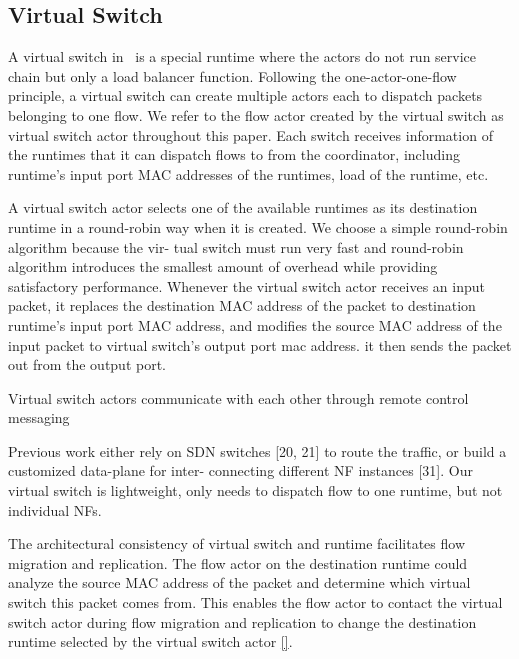 \subsection{Virtual Switch}
\label{sec:virtualswitch}

A virtual switch in \nfactor~is a special runtime where the actors do not run service chain but only a load balancer function. Following the one-actor-one-flow principle, a virtual switch can create multiple actors each to dispatch packets belonging to one flow.  We refer to the flow actor created by the virtual switch as virtual switch actor throughout this paper. Each switch receives information of the runtimes that it can dispatch flows to from the coordinator, including runtime's input port MAC addresses of the runtimes, load of the runtime, etc.


A virtual switch actor selects one of the available runtimes  as its destination runtime in a round-robin way when it is created. We choose a simple round-robin algorithm because the vir- tual switch must run very fast and round-robin algorithm introduces the smallest amount of overhead while providing satisfactory performance. Whenever the virtual switch actor receives an input packet, it replaces the destination MAC address of the packet to destination runtime's input port MAC address, and modifies the source MAC address of the input packet to virtual switch's output port mac address. it then sends the packet out from the output port.


Virtual switch actors communicate with each other through remote control messaging 





Previous work either rely on SDN switches [20, 21] to route the traffic, or build a customized data-plane for inter- connecting different NF instances [31]. Our virtual switch is lightweight, only needs to dispatch flow to one runtime, but not individual NFs.


The architectural consistency of virtual switch and runtime facilitates flow migration and replication. The flow actor on the destination runtime could analyze the source MAC address of the packet and determine which virtual switch this packet comes from. This enables the flow actor to contact the virtual switch actor during flow migration and replication to change the destination runtime selected by the virtual switch actor \ref{}.

